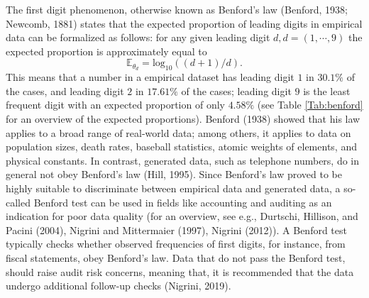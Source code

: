 \documentclass[
  english,
  man,floatsintext]{apa6}
\begin{document}
The first digit phenomenon, otherwise known as Benford's law (Benford, 1938; Newcomb, 1881) states that the expected proportion of leading digits in empirical data can be formalized as follows: for any given leading digit \(d, d = (1, \cdots, 9)\) the expected proportion is approximately equal to \[\mathbb{E}_{\theta_d}= \text{log}_{10}((d + 1)/d).\] This means that a number in a empirical dataset has leading digit \(1\) in \(30.1 \%\) of the cases, and leading digit \(2\) in \(17.61 \%\) of the cases; leading digit \(9\) is the least frequent digit with an expected proportion of only \(4.58 \%\) (see Table \ref{Tab:benford} for an overview of the expected proportions). Benford (1938) showed that his law applies to a broad range of real-world data; among others, it applies to data on population sizes, death rates, baseball statistics, atomic weights of elements, and physical constants. In contrast, generated data, such as telephone numbers, do in general not obey Benford's law (Hill, 1995). Since Benford's law proved to be highly suitable to discriminate between empirical data and generated data, a so-called Benford test can be used in fields like accounting and auditing as an indication for poor data quality (for an overview, see e.g., Durtschi, Hillison, and Pacini (2004), Nigrini and Mittermaier (1997), Nigrini (2012)). A Benford test typically checks whether observed frequencies of first digits, for instance, from fiscal statements, obey Benford's law. Data that do not pass the Benford test, should raise audit risk concerns, meaning that, it is recommended that the data undergo additional follow-up checks (Nigrini, 2019).
\end{document}
